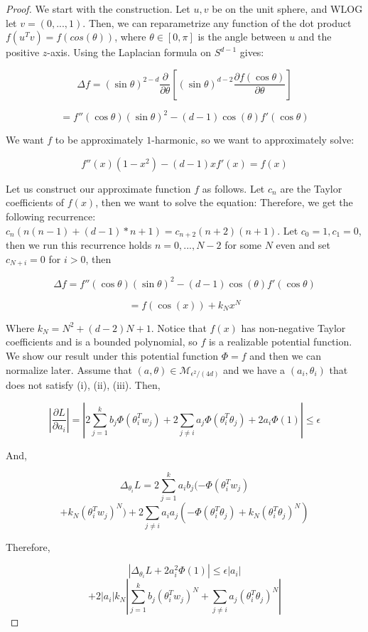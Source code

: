 \documentclass{article}
\newcommand{\pd}[2]{\frac{\partial#1}{\partial#2}}
\begin{document}
\begin{proof}
We start with the construction. Let $u,v$ be on the unit sphere, and WLOG let $v = (0,...,1)$. Then, we can reparametrize any function of the dot product $f(u^Tv) = f(cos(\theta))$, where $\theta \in [0, \pi]$ is the angle between $u$ and the positive $z$-axis.
Using the Laplacian formula on $S^{d-1}$ gives:

\[\Delta f = (\sin \theta)^{2-d} \frac{\partial}{\partial \theta}\left[ (\sin \theta)^{d-2} \frac{\partial f(\cos \theta)}{\partial \theta}\right] \]

\[= f''(\cos\theta)(\sin \theta)^{2} - (d-1)\cos(\theta)f'(\cos\theta)\]

We want $f$ to be approximately $1$-harmonic, so we want to approximately solve:

\[f''(x)(1-x^2) - (d-1)xf'(x) =  f(x) \]

Let us construct our approximate function $f$ as follows. Let $c_n$ are the Taylor coefficients of $f(x)$, then we want to solve the equation:
Therefore, we get the following recurrence: $c_n (n(n-1) + (d-1)*n + 1) = c_{n+2} (n+2)(n+1)$. Let $c_0 = 1, c_1 = 0$, then we run this recurrence holds $n=0,...,N-2$ for some $N$ even and set $c_{N+i} = 0$ for $i > 0$, then

\[\Delta f = f''(\cos\theta)(\sin \theta)^{2} - (d-1)\cos(\theta)f'(\cos\theta)\]

\[ = f(\cos(x)) + k_Nx^N\]

Where $k_N = N^2 + (d-2)N + 1$. Notice that $f(x)$ has non-negative Taylor coefficients and is a bounded polynomial, so $f$ is a realizable potential function. \\

We show our result under this potential function $\Phi = f$ and then we can normalize later. Assume that $(a, \theta) \in \mathcal{M}_{\epsilon^2/(4d)}$ and we have a $(a_i,\theta_i)$ that does not satisfy (i), (ii), (iii). Then,

\[|\pd{L}{a_i}| = |2\sum_{j=1}^k  b_j  \Phi(\theta_i^T w_j) +  2\sum_{j\neq i} a_j \Phi(\theta_i^T\theta_j)  + 2a_i\Phi(1)| \leq \epsilon \] 

And, 

\[\Delta_{\theta_i} L =  2\sum_{j=1}^k a_i b_j  (-\Phi(\theta_i^T w_j) \]
\[+ k_N(\theta_i^Tw_j)^N) +  2\sum_{j\neq i} a_i a_j(-\Phi(\theta_i^T\theta_j) + k_N(\theta_i^T\theta_j)^N)\]

Therefore,

\[|\Delta_{\theta_i}L + 2a_i^2\Phi(1)| \leq \epsilon |a_i| \]
\[+  2|a_i| k_N|\sum_{j=1}^k b_j (\theta_i^Tw_j)^N +  \sum_{j\neq i}  a_j(\theta_i^T\theta_j)^N|\]


\end{proof}
\end{document}
